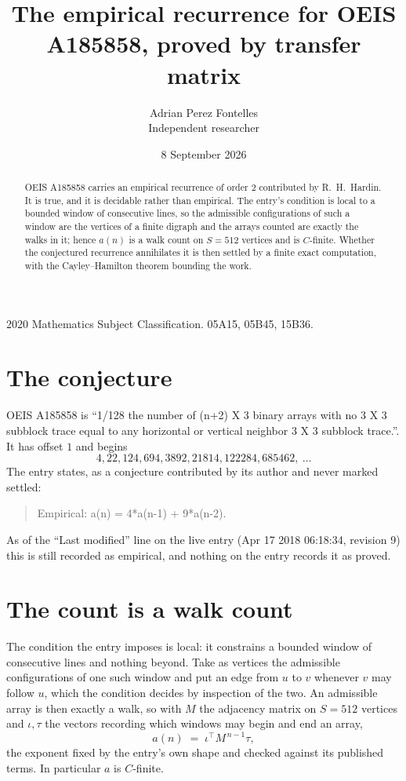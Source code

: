 \documentclass[11pt,a4paper]{article}
\title{The empirical recurrence for OEIS A185858, proved by transfer matrix}
\author{Adrian Perez Fontelles\\ \small Independent researcher}
\date{8 September 2026}
\theoremstyle{plain}
\theoremstyle{definition}
\begin{document}
\maketitle

\begin{abstract}
OEIS A185858 carries an empirical recurrence of order $2$ contributed by R.~H.~Hardin. It is
true, and it is decidable rather than empirical. The entry's condition is local to a bounded window of consecutive lines, so
the admissible configurations of such a window are the vertices of a finite digraph and the
arrays counted are exactly the walks in it; hence $a(n)$ is a walk count on $S=512$ vertices
and is $C$-finite. Whether the conjectured recurrence annihilates it is then settled by a
finite exact computation, with the Cayley--Hamilton theorem bounding the work.
\end{abstract}

\noindent\small 2020 Mathematics Subject Classification. 05A15, 05B45, 15B36.\normalsize

\section{The conjecture}

OEIS A185858 is ``1/128 the number of (n+2) X 3 binary arrays with no 3 X 3 subblock trace equal to any horizontal or vertical neighbor 3 X 3 subblock trace.''. It has offset $1$ and begins
\[
4, 22, 124, 694, 3892, 21814, 122284, 685462,\ \dots
\]
The entry states, as a conjecture contributed by its author and never marked settled:
\begin{quote}
Empirical: a(n) = 4*a(n-1) + 9*a(n-2).
\end{quote}
As of the ``Last modified'' line on the live entry (Apr 17 2018 06:18:34, revision 9) this is still
recorded as empirical, and nothing on the entry records it as proved.

\section{The count is a walk count}

The condition the entry imposes is local: it constrains a bounded window of consecutive lines and nothing beyond. Take as
vertices the admissible configurations of one such window and put an edge from $u$ to $v$
whenever $v$ may follow $u$, which the condition decides by inspection of the two. An
admissible array is then exactly a walk, so with $M$ the adjacency matrix on $S=512$ vertices
and $\iota,\tau$ the vectors recording which windows may begin and end an array,
\[
a(n)\;=\;\iota^{\!\top}M^{\,n-1}\tau ,
\]
the exponent fixed by the entry's own shape and checked against its published terms. In
particular $a$ is $C$-finite.
\end{document}
